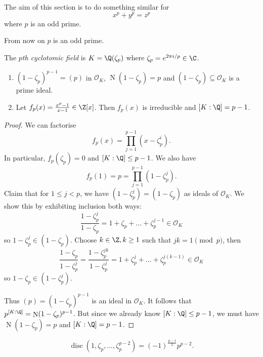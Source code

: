 \documentclass[a4paper]{article}
\renewcommand*{\O}{\mathcal{O}}
\DeclareMathOperator{\n}{N}
\DeclareMathOperator{\disc}{disc}
\begin{document}
The aim of this section is to do something similar for
\[
  x^p + y^p = z^p
\]
where \(p\) is an odd prime.


From now on \(p\) is an odd prime.

\begin{definition}
  The \emph{\(p\)th cyclotomic field} is \(K = \Q(\zeta_p)\) where \(\zeta_p = e^{2\pi i/p} \in \C\).
\end{definition}

\begin{lemma}\leavevmode
  \begin{enumerate}
  \item \((1 - \zeta_p)^{p - 1} = (p)\) in \(\O_K\), \(\n(1 - \zeta_p) = p\) and \((1 - \zeta_p) \subseteq \O_K\) is a prime ideal.
  \item Let \(f_p(x) = \frac{x^p - 1}{x - 1} \in \Z[x]\). Then \(f_p(x)\) is irreducible and \([K:\Q] = p - 1\).
  \end{enumerate}
\end{lemma}

\begin{proof}
  We can factorise
  \[
    f_p(x) = \prod_{j = 1}^{p - 1} (x - \zeta_p^i).
  \]
  In particular, \(f_p(\zeta_p) = 0\) and \([K: \Q] \leq p - 1\). We also have
  \[
    f_p(1) = p = \prod_{j = 1}^{p - 1} (1 - \zeta_p^j).
  \]
  Claim that for \(1 \leq j < p\),  we have \((1 - \zeta_p^j) = (1 - \zeta_p)\) as ideals of \(\O_K\). We show this by exhibiting inclusion both ways:
  \[
    \frac{1 - \zeta_p^j}{1 - \zeta_p} = 1 + \zeta_p + \dots + \zeta_p^{j - 1} \in \O_K
  \]
  so \(1 - \zeta_p^j \in (1 - \zeta_p)\). Choose \(k \in \Z, k \geq 1\) such that \(jk = 1 \pmod p\), then
  \[
    \frac{1 - \zeta_p}{1 - \zeta_p^j} = \frac{1 - \zeta_p^{jk}}{1 - \zeta_p^j} = 1 + \zeta_p^j + \dots + \zeta_p^{j(k - 1)} \in \O_K
  \]
  so \(1 - \zeta_p \in (1 - \zeta_p^j)\).

  Thus \((p) = (1 - \zeta_p)^{p - 1}\) is an ideal in \(\O_K\). It follows that \(p^{[K: \Q]} = \n(1 - \zeta_p)^{p - 1}\). But since we already know \([K: \Q] \leq p - 1\), we must have \(\n(1 - \zeta_p) = p\) and \([K: \Q] = p - 1\).
\end{proof}

\begin{lemma}
  \[
    \disc(1, \zeta_p, \dots, \zeta_p^{p - 2}) = (-1)^{\frac{p - 1}{2}} p^{p - 2}.
  \]
\end{lemma}
\end{document}
